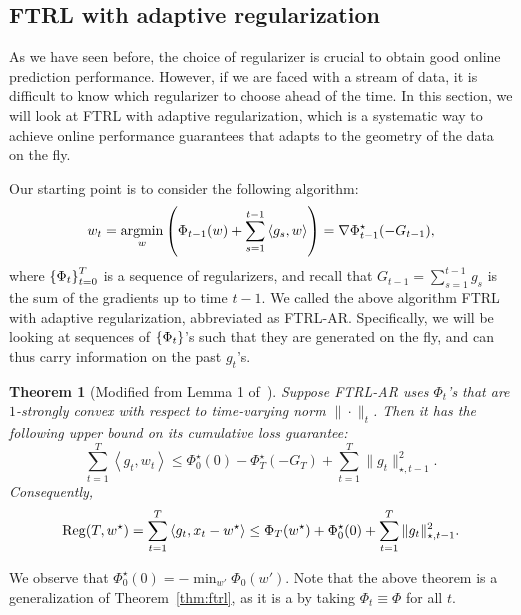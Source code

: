 \documentclass{article}
\newtheorem{theorem}{Theorem}
\DeclareMathOperator*{\Reg}{{\rm Reg}}
\DeclareMathOperator*{\argmin}{{\rm argmin}}
\newcommand{\inner}[2]{\left\langle #1,#2 \right\rangle}
\begin{document}
\subsection{FTRL with adaptive regularization}
As we have seen before, the choice of regularizer is crucial to obtain good online prediction performance. However, if we are faced with a stream of data, it is difficult to know which regularizer to choose ahead of the time.
In this section, we will look at FTRL with adaptive regularization, which is a systematic way to achieve online performance guarantees that adapts to the geometry of the data on the fly.

Our starting point is to consider the following algorithm:
\[ w_t = \argmin_w \del{ \Phi_{t-1}(w) + \sum_{s=1}^{t-1} \inner{g_s}{w} } = \nabla \Phi_{t-1}^\star(-G_{t-1}), \]
where $\cbr{\Phi_{t}}_{t=0}^T$ is a sequence of regularizers, and
recall that $G_{t-1} = \sum_{s=1}^{t-1} g_s$ is the sum of the gradients up to time $t-1$.
We called the above algorithm FTRL with adaptive regularization, abbreviated as FTRL-AR.
Specifically, we will be looking at sequences of $\cbr{\Phi_t}$'s such that they are generated on the fly, and can thus carry information on the past $g_t$'s.

\begin{theorem}[Modified from Lemma 1 of~\cite{orabona2015generalized}]
Suppose FTRL-AR uses $\Phi_t$'s that are $1$-strongly convex with respect to time-varying norm $\| \cdot \|_{t}$.
Then it has the following upper bound on its cumulative loss guarantee:
\[ \sum_{t=1}^T \inner{g_t}{w_t} \leq \Phi_0^\star(0) - \Phi_T^\star(-G_T) + \sum_{t=1}^T \| g_t \|_{\star, t-1}^2. \]
Consequently,
\[ \Reg(T, w^\star) = \sum_{t=1}^T \inner{g_t}{x_t - w^\star} \leq \Phi_T(w^\star) + \Phi_0^\star(0) + \sum_{t=1}^T \| g_t \|_{\star, t-1}^2. \]
\label{thm:ftrl-ar}
\end{theorem}

We observe that $\Phi_0^\star(0) = -\min_{w'} \Phi_0(w')$.
Note that the above theorem is a generalization of Theorem~\ref{thm:ftrl}, as it is a by taking $\Phi_t \equiv \Phi$ for all $t$.
\end{document}
